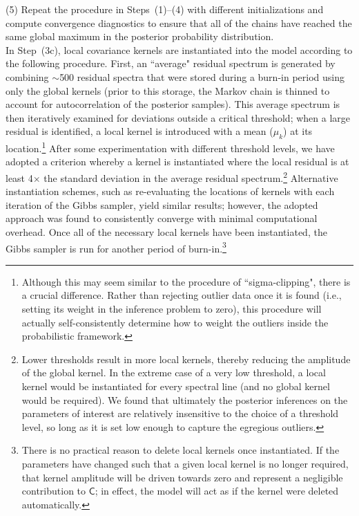 \documentclass[iop,floatfix,numberedappendix,twocolappendix]{emulateapj}
\newcommand{\vC}{\mathsf{C}}
\begin{document}
\noindent (5) Repeat the procedure in Steps~(1)--(4) with different initializations and compute 
convergence diagnostics to ensure that all of the chains have reached the same global maximum in 
the posterior probability distribution. \\

In Step~(3c), local covariance kernels are instantiated into the model according to the following 
procedure.  First, an ``average" residual spectrum is generated by combining $\sim$500 residual 
spectra that were stored during a burn-in period using only the global kernels (prior to this 
storage, the Markov chain is thinned to account for autocorrelation of the posterior samples).  
This average spectrum is then iteratively examined for deviations outside a critical threshold; 
when a large residual is identified, a local kernel is introduced with a mean ($\mu_k$) at its 
location.\footnote{Although this may seem similar to the procedure of ``sigma-clipping", there is a 
crucial difference.  Rather than rejecting outlier data once it is found (i.e., setting its weight 
in the inference problem to zero), this procedure will actually self-consistently determine how to 
weight the outliers inside the probabilistic framework.}  After some experimentation with different 
threshold levels, we have adopted a criterion whereby a kernel is instantiated where the local 
residual is at least 4$\times$ the standard deviation in the average residual 
spectrum.\footnote{Lower thresholds result in more local kernels, thereby reducing the amplitude of 
the global kernel.  In the extreme case of a very low threshold, a local kernel would be 
instantiated for every spectral line (and no global kernel would be required).  We found that 
ultimately the posterior inferences on the parameters of interest are relatively insensitive to the 
choice of a threshold level, so long as it is set low enough to capture the egregious outliers.}  
Alternative instantiation schemes, such as re-evaluating the locations of kernels with each 
iteration of the Gibbs sampler, yield similar results; however, the adopted approach was found to 
consistently converge with minimal computational overhead.  Once all of the necessary local kernels 
have been instantiated, the Gibbs sampler is run for another period of burn-in.\footnote{There is 
no practical reason to delete local kernels once instantiated.  If the parameters have changed such 
that a given local kernel is no longer required, that kernel amplitude will be driven towards zero 
and represent a negligible contribution to $\vC$; in effect, the model will act as if the kernel 
were deleted automatically.}
\end{document}
